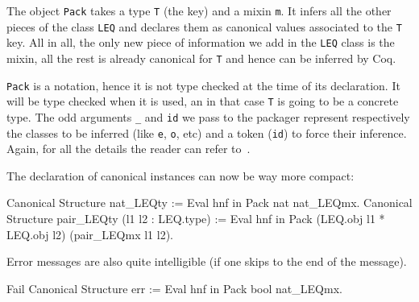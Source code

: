 The object \texttt{Pack} takes a type \texttt{T} (the key) and a mixin \texttt{m}.  It infers all
the other pieces of the class \texttt{LEQ} and declares them as canonical values
associated to the \texttt{T} key.  All in all, the only new piece of information
we add in the \texttt{LEQ} class is the mixin, all the rest is already canonical
for \texttt{T} and hence can be inferred by Coq.

\texttt{Pack} is a notation, hence it is not type checked at the time of its
declaration.  It will be type checked when it is used, an in that case
\texttt{T} is going to be a concrete type.  The odd arguments \texttt{\_} and \texttt{id} we
pass to the
packager represent respectively the classes to be inferred (like \texttt{e}, \texttt{o}, etc) and a token (\texttt{id}) to force their inference.  Again, for all the details the
reader can refer to~\cite{CSwcu}.

The declaration of canonical instances can now be way more compact:

\begin{coq_example}
Canonical Structure nat_LEQty := Eval hnf in Pack nat nat_LEQmx.
Canonical Structure pair_LEQty (l1 l2 : LEQ.type) :=
  Eval hnf in Pack (LEQ.obj l1 * LEQ.obj l2) (pair_LEQmx l1 l2).
\end{coq_example}

Error messages are also quite intelligible (if one skips to the end of
the message).

\begin{coq_example}
Fail Canonical Structure err := Eval hnf in Pack bool nat_LEQmx.
\end{coq_example}

